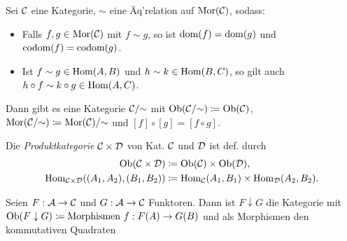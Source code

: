 \documentclass{cheat-sheet}
\begin{document}
\begin{bem}
  Sei $\mathcal{C}$ eine Kategorie, ${\sim}$ eine Äq'relation auf $\operatorname{Mor}(\mathcal{C})$, sodass:
  \begin{itemize}
    \item Falls $f, g \in \operatorname{Mor}(\mathcal{C})$ mit $f \sim g$, so ist $\operatorname{dom}(f) = \operatorname{dom}(g)$ und $\operatorname{codom}(f) = \operatorname{codom}(g)$.
    \item Ist $f \sim g \in \operatorname{Hom}(A, B)$ und $h \sim k \in \operatorname{Hom}(B, C)$, so gilt auch $h \circ f \sim k \circ g \in \operatorname{Hom}(A, C)$.
  \end{itemize}
  Dann gibt es eine Kategorie $\mathcal{C}/{\sim}$ mit $\operatorname{Ob}(\mathcal{C}/{\sim}) \coloneqq \operatorname{Ob}(\mathcal{C})$, $\operatorname{Mor}(\mathcal{C}/{\sim}) \coloneqq \operatorname{Mor}(\mathcal{C})/{\sim}$ und $[f] \circ [g] = [f \circ g]$.
\end{bem}

\begin{defn}
  Die \emph{Produktkategorie} $\mathcal{C} \times \mathcal{D}$ von Kat. $\mathcal{C}$ und $\mathcal{D}$ ist def. durch
  \begin{align*}
    \operatorname{Ob}(\mathcal{C} \times \mathcal{D}) & \coloneqq \operatorname{Ob}(\mathcal{C}) \times \operatorname{Ob}(\mathcal{D}), \\
    \operatorname{Hom}_{\mathcal{C} \times \mathcal{D}}((A_1, A_2), (B_1, B_2)) & \coloneqq \operatorname{Hom}_{\mathcal{C}}(A_1, B_1) \times \operatorname{Hom}_{\mathcal{D}}(A_2, B_2).
  \end{align*}
\end{defn}

\begin{defn}
  Seien $F : \mathcal{A} \to \mathcal{C}$ und $G : \mathcal{A} \to \mathcal{C}$ Funktoren. Dann ist \emph{$F \downarrow G$} die Kategorie mit
  $\operatorname{Ob}(F \downarrow G) \coloneqq \text{Morphismen } f : F(A) \to G(B)$
  und als Morphismen den kommutativen Quadraten
  \begin{center}
    \vspace{-4pt}
    \vspace{-4pt}
  \end{center}
\end{defn}
\end{document}

